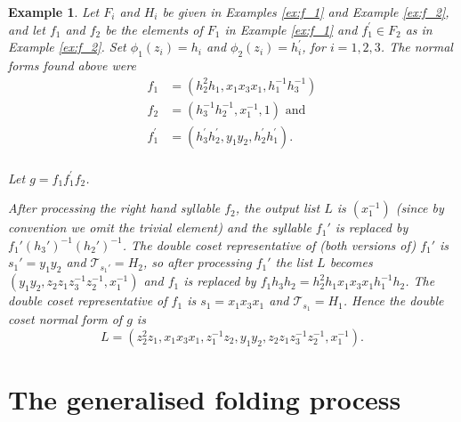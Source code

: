 \documentclass[a4paper,12pt]{article}
\newtheorem{exam}[theorem]{Example}
\newenvironment{example}{\begin{exam} \rm}{\end{exam}}
\numberwithin{equation}{section}
\numberwithin{figure}{section}
\newcommand{\cT}{\mathcal{T}}
\begin{document}
\begin{example}\label{ex:g}
Let $F_i$ and $H_i$ be given in Examples \ref{ex:f_1} and
Example \ref{ex:f_2}, and
let $f_1$ and $f_2$ be the elements of $F_1$ in Example \ref{ex:f_1} and
$f_1^\prime\in F_2$ as in Example \ref{ex:f_2}.
Set $\phi_1(z_i) = h_i$ and $\phi_2(z_i) = h_i^{\prime}$, for $i= 1,2,3$.
The normal forms found above were 
\begin{align*}
f_1&=(h_2^{2}h_1, x_1x_3x_1, h_1^{-1}h_3^{-1})\\
f_2&=(h_3^{-1}h_2^{-1}, x_1^{-1}, 1)\textrm{ and }\\
f_1^\prime&=(h^\prime_3h_2^\prime, y_1y_2, h_2^\prime h_1^\prime).\\
\end{align*}

Let $g =f_1 f_1^\prime f_2$. 

After processing the right hand syllable $f_2$, 
  the output list $L$ is  $(x_1^{-1})$ 
(since by convention we omit  the trivial element) and the syllable 
$f_1'$ is replaced by $f_1' (h_3')^{-1}(h_2')^{-1}$. The 
double coset representative of (both versions of) $f_1'$ is 
$s_1'=y_1y_2$ and $\cT_{s_1'}=H_2$, so after processing $f_1'$ the
list $L$ becomes $(y_1y_2, z_2z_1z_3^{-1}z_2^{-1}, x_1^{-1})$ and 
$f_1$ is replaced by $f_1h_3h_2=h_2^{2}h_1 x_1x_3x_1 h_1^{-1}h_2$. 
The double coset representative of $f_1$ is $s_1=x_1x_3x_1$ and 
$\cT_{s_1}=H_1$. 
Hence the  double coset normal form of $g$ is 
\[L=(z_2^2 z_1,  x_1 x_3 x_1, z_1^{-1}z_2,
y_1y_2, z_2 z_1z_3^{-1}z_2^{-1}, x_1^{-1}).
\]
\end{example}

\section{The generalised folding process}\label{sec:foldings}
\end{document}
